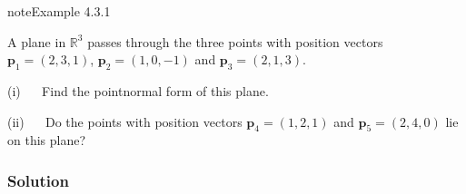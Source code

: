 \documentclass[letterpaper,10pt,english]{jupyterBook}
\begin{document}
\label{_pages/4.2_Planes:point-normal-example}
\begin{sphinxadmonition}{note}{Example 4.3.1}



\sphinxAtStartPar
A plane in \(\mathbb{R}^3\) passes through the three points with position vectors \(\mathbf{p}_1 = (2, 3, 1)\), \(\mathbf{p}_2 = (1, 0, -1)\) and \(\mathbf{p}_3 = (2, 1, 3)\).

\sphinxAtStartPar
(i)   Find the point\sphinxhyphen{}normal form of this plane.

\sphinxAtStartPar
(ii)   Do the points with position vectors \(\mathbf{p}_4 = (1, 2, 1)\) and \(\mathbf{p}_5 = (2, 4, 0)\) lie on this plane?
\subsubsection*{Solution}


\end{sphinxadmonition}
\end{document}

